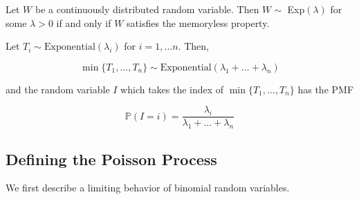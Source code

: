 \documentclass{article}
\begin{document}
    \begin{theorem}
      Let $W$ be a continuously distributed random variable. Then $W \sim$ Exp$(\lambda)$ for some $\lambda > 0$ if and only if $W$ satisfies the memoryless property. 
    \end{theorem}

    \begin{theorem}
      Let $T_i \sim \mathrm{Exponential}(\lambda_i)$ for $i = 1, \ldots n$. Then, 

        \[\min\{T_1, \ldots, T_n\} \sim \mathrm{Exponential}(\lambda_1 + \ldots + \lambda_n)\]

      and the random variable $I$ which takes the index of $\min\{T_1, \ldots, T_n\}$ has the PMF 

        \[\mathbb{P}(I = i) = \frac{\lambda_i}{\lambda_1 + \ldots + \lambda_n}\]
    \end{theorem}

  \subsection{Defining the Poisson Process}

    We first describe a limiting behavior of binomial random variables. 
\end{document}

